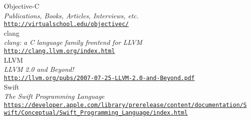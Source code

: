 \cleardoublepage
{}
{}
\begin{thebibliography}{}

 Objective-C\\
  \emph{Publications, Books, Articles, Interviews, etc.} \\
  \footnotesize \texttt{\url{http://virtualschool.edu/objectivec/}} \\
  
 clang\\
  \emph{clang: a C language family frontend for LLVM} \\
  \footnotesize \texttt{\url{http://clang.llvm.org/index.html}} \\
  
 LLVM\\
 \emph{LLVM 2.0 and Beyond!} \\
  \footnotesize \texttt{\url{http://llvm.org/pubs/2007-07-25-LLVM-2.0-and-Beyond.pdf}} \\
  
 Swift\\
 \emph{The Swift Programming Language} \\
  \footnotesize \texttt{\url{https://developer.apple.com/library/prerelease/content/documentation/Swift/Conceptual/Swift_Programming_Language/index.html}} \\
  
\end{thebibliography}

